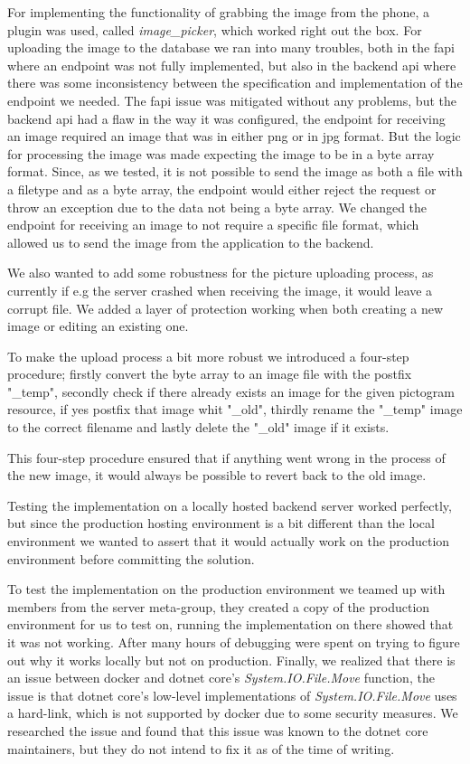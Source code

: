 For implementing the functionality of grabbing the image from the phone, a plugin was used, called \textit{image\_picker}, which worked right out the box.
For uploading the image to the database we ran into many troubles, both in the \gls{fapi} where an endpoint was not fully implemented, but also in the backend \gls{api} where there was some inconsistency between the specification and implementation of the endpoint we needed. The \gls{fapi} issue was mitigated without any problems, but the backend \gls{api} had a flaw in the way it was configured, the endpoint for receiving an image required an image that was in either png or in jpg format. But the logic for processing the image was made expecting the image to be in a byte array format. Since, as we tested, it is not possible to send the image as both a file with a filetype and as a byte array, the endpoint would either reject the request or throw an exception due to the data not being a byte array.
We changed the endpoint for receiving an image to not require a specific file format, which allowed us to send the image from the application to the backend.

We also wanted to add some robustness for the picture uploading process, as currently if e.g the server crashed when receiving the image, it would leave a corrupt file. We added a layer of protection working when both creating a new image or editing an existing one.

To make the upload process a bit more robust we introduced a four-step procedure; firstly convert the byte array to an image file with the postfix "\_temp", secondly check if there already exists an image for the given pictogram resource, if yes postfix that image whit "\_old", thirdly rename the "\_temp" image to the correct filename and lastly delete the "\_old" image if it exists.

This four-step procedure ensured that if anything went wrong in the process of the new image, it would always be possible to revert back to the old image.

Testing the implementation on a locally hosted backend server worked perfectly, but since the production hosting environment is a bit different than the local environment we wanted to assert that it would actually work on the production environment before committing the solution.

To test the implementation on the production environment we teamed up with members from the server meta-group, they created a copy of the production environment for us to test on, running the implementation on there showed that it was not working. After many hours of debugging were spent on trying to figure out why it works locally but not on production. Finally, we realized that there is an issue between docker and dotnet core's \textit{System.IO.File.Move} function, the issue is that dotnet core's low-level implementations of \textit{System.IO.File.Move} uses a hard-link, which is not supported by docker due to some security measures. We researched the issue and found that this issue was known to the dotnet core maintainers, but they do not intend to fix it as of the time of writing.

